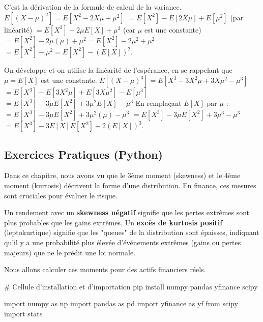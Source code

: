 \begin{correctionbox}
C'est la dérivation de la formule de calcul de la variance.
$E[(X-\mu)^2] = E[X^2 - 2X\mu + \mu^2]$
$= E[X^2] - E[2X\mu] + E[\mu^2]$ (par linéarité)
$= E[X^2] - 2\mu E[X] + \mu^2$ (car $\mu$ est une constante)
$= E[X^2] - 2\mu(\mu) + \mu^2 = E[X^2] - 2\mu^2 + \mu^2$
$= E[X^2] - \mu^2 = E[X^2] - (E[X])^2$.
\end{correctionbox}

\begin{correctionbox}
On développe et on utilise la linéarité de l'espérance, en se rappelant que $\mu=E[X]$ est une constante.
$E[(X-\mu)^3] = E[X^3 - 3X^2\mu + 3X\mu^2 - \mu^3]$
$= E[X^3] - E[3X^2\mu] + E[3X\mu^2] - E[\mu^3]$
$= E[X^3] - 3\mu E[X^2] + 3\mu^2 E[X] - \mu^3$
En remplaçant $E[X]$ par $\mu$ :
$= E[X^3] - 3\mu E[X^2] + 3\mu^2(\mu) - \mu^3$
$= E[X^3] - 3\mu E[X^2] + 3\mu^3 - \mu^3$
$= E[X^3] - 3E[X]E[X^2] + 2(E[X])^3$.
\end{correctionbox}

\subsection{Exercices Pratiques (Python)}

Dans ce chapitre, nous avons vu que le 3ème moment (skewness) et le 4ème moment (kurtosis) décrivent la forme d'une distribution. En finance, ces mesures sont cruciales pour évaluer le risque.

Un rendement avec un \textbf{skewness négatif} signifie que les pertes extrêmes sont plus probables que les gains extrêmes. Un \textbf{excès de kurtosis positif} (leptokurtique) signifie que les "queues" de la distribution sont épaisses, indiquant qu'il y a une probabilité plus élevée d'événements extrêmes (gains ou pertes majeurs) que ne le prédit une loi normale.

Nous allons calculer ces moments pour des actifs financiers réels.

\begin{codecell}
# Cellule d'installation et d'importation
pip install numpy pandas yfinance scipy
\end{codecell}

\begin{codecell}
import numpy as np
import pandas as pd
import yfinance as yf
from scipy import stats
\end{codecell}

